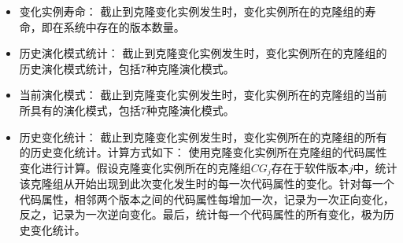 \begin{itemize}
\item 
变化实例寿命：
截止到克隆变化实例发生时，变化实例所在的克隆组的寿命，即在系统中存在的版本数量。
\item 
历史演化模式统计：
截止到克隆变化实例发生时，变化实例所在的克隆组的历史演化模式统计，包括7种克隆演化模式。
\item 
当前演化模式：
截止到克隆变化实例发生时，变化实例所在的克隆组的当前所具有的演化模式，包括7种克隆演化模式。
\item 
历史变化统计：
截止到克隆变化实例发生时，变化实例所在的克隆组的所有的历史变化统计。计算方式如下： 使用克隆变化实例所在克隆组的代码属性变化进行计算。假设克隆变化实例所在的克隆组$CG_j$存在于软件版本$j$中，统计该克隆组从开始出现到此次变化发生时的每一次代码属性的变化。针对每一个代码属性，相邻两个版本之间的代码属性每增加一次，记录为一次正向变化，反之，记录为一次逆向变化。最后，统计每一个代码属性的所有变化，极为历史变化统计。
\end{itemize}



